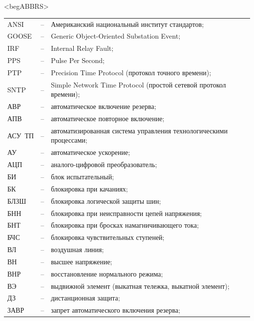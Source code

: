 \color{unimain}\section*{}
{\color{white}\fontsize{0.1pt}{0.1pt}\selectfont<begABBRS>}
\color{black}
\begin{longtable}{>{\raggedright\arraybackslash}m{2cm}>{\raggedright\arraybackslash}m{0.5cm}>{\raggedright\arraybackslash}m{20cm}}
\endfirsthead\endhead\endfoot\endlastfoot
ANSI & -- & Американский национальный институт стандартов; \\
GOOSE & -- & Generic Object-Oriented Substation Event; \\
IRF & -- & Internal Relay Fault; \\
PPS & -- & Pulse Per Second; \\
PTP & -- & Precision Time Protocol (протокол точного времени); \\
SNTP & -- & Simple Network Time Protocol (простой сетевой протокол времени); \\
АВР & -- & автоматическое включение резерва; \\
АПВ & -- & автоматическое повторное включение; \\
АСУ~ТП & -- & автоматизированная система управления технологическими процессами; \\
АУ & -- & автоматическое ускорение; \\
АЦП & -- & аналого-цифровой преобразователь; \\
БИ & -- & блок испытательный; \\
БК & -- & блокировка при качаниях; \\
БЛЗШ & -- & блокировка логической защиты шин; \\
БНН & -- & блокировка при неисправности цепей напряжения; \\
БНТ & -- & блокировка при бросках намагничивающего тока; \\
БЧС & -- & блокировка чувствительных ступеней; \\
ВЛ & -- & воздушная линия; \\
ВН & -- & высшее напряжение; \\
ВНР & -- & восстановление нормального режима; \\
ВЭ & -- & выдвижной элемент (выкатная тележка, выкатной элемент); \\
ДЗ & -- & дистанционная защита; \\
ЗАВР & -- & запрет автоматического включения резерва; \\

\end{longtable}

